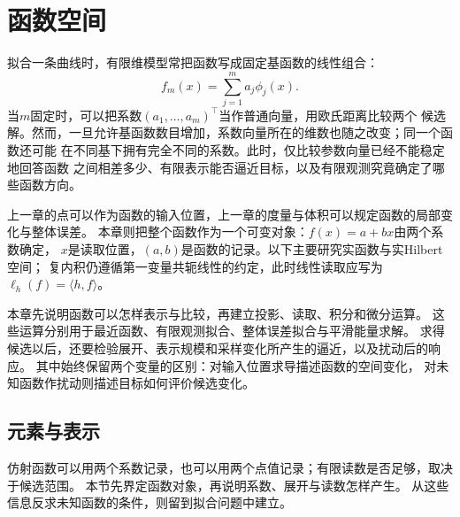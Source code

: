 \chapter{函数空间}
\label{chap:functional-analysis-and-approximation}

\newcommand{\functionalinlinetablecaption}[2]{%
  \refstepcounter{table}\label{#1}%
  \addcontentsline{lot}{table}{\protect\numberline{\thetable}#2}%
  \par\smallskip\noindent
  {\figurefont\footnotesize
   \textcolor{BookTeal}{表~\thetable}\quad #2}\par}
\newcommand{\functionalinlinefigurecaption}[2]{%
  \refstepcounter{figure}\label{#1}%
  \addcontentsline{lof}{figure}{\protect\numberline{\thefigure}#2}%
  \par\smallskip\noindent
  {\figurefont\footnotesize
   \textcolor{BookTeal}{图~\thefigure}\quad #2}\par}

拟合一条曲线时，有限维模型常把函数写成固定基函数的线性组合：
\begin{equation}
  f_m(x)=\sum_{j=1}^{m}a_j\phi_j(x).
  \label{eq:functional-finite-basis-expansion}
\end{equation}
当$m$固定时，可以把系数$(a_1,\ldots,a_m)^{\top}$当作普通向量，用欧氏距离比较两个
候选解。然而，一旦允许基函数数目增加，系数向量所在的维数也随之改变；同一个函数还可能
在不同基下拥有完全不同的系数。此时，仅比较参数向量已经不能稳定地回答函数
之间相差多少、有限表示能否逼近目标，以及有限观测究竟确定了哪些函数方向。


上一章的点可以作为函数的输入位置，上一章的度量与体积可以规定函数的局部变化与整体误差。
本章则把整个函数作为一个可变对象：$f(x)=a+bx$由两个系数确定，
$x$是读取位置，$(a,b)$是函数的记录。以下主要研究实函数与实Hilbert空间；
复内积仍遵循第一变量共轭线性的约定，此时线性读取应写为$\ell_h(f)=\langle h,f\rangle$。

本章先说明函数可以怎样表示与比较，再建立投影、读取、积分和微分运算。
这些运算分别用于最近函数、有限观测拟合、整体误差拟合与平滑能量求解。
求得候选以后，还要检验展开、表示规模和采样变化所产生的逼近，以及扰动后的响应。
其中始终保留两个变量的区别：对输入位置求导描述函数的空间变化，
对未知函数作扰动则描述目标如何评价候选变化。
\section{元素与表示}
\label{sec:functional-functions-as-space-elements}

仿射函数可以用两个系数记录，也可以用两个点值记录；有限读数是否足够，取决于候选范围。
本节先界定函数对象，再说明系数、展开与读数怎样产生。
从这些信息反求未知函数的条件，则留到拟合问题中建立。

